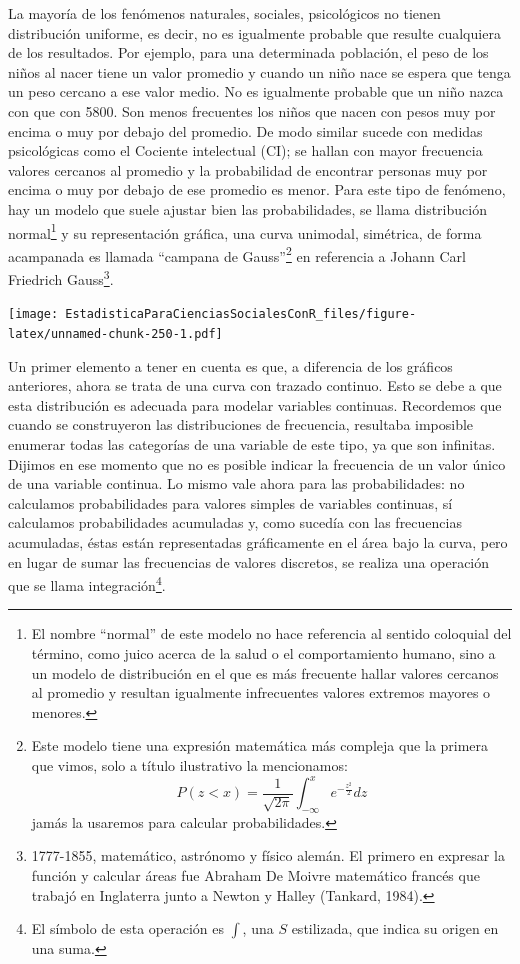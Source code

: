 \documentclass[]{book}
\let\rmarkdownfootnote\footnote%
\def\footnote{\protect\rmarkdownfootnote}
\begin{document}
La mayoría de los fenómenos naturales, sociales, psicológicos no tienen
distribución uniforme, es decir, no es igualmente probable que resulte
cualquiera de los resultados. Por ejemplo, para una determinada
población, el peso de los niños al nacer tiene un valor promedio y
cuando un niño nace se espera que tenga un peso cercano a ese valor
medio. No es igualmente probable que un niño nazca con que con 5800. Son
menos frecuentes los niños que nacen con pesos muy por encima o muy por
debajo del promedio. De modo similar sucede con medidas psicológicas
como el Cociente intelectual (CI); se hallan con mayor frecuencia
valores cercanos al promedio y la probabilidad de encontrar personas muy
por encima o muy por debajo de ese promedio es menor. Para este tipo de
fenómeno, hay un modelo que suele ajustar bien las probabilidades, se
llama distribución normal\footnote{El nombre ``normal'' de este modelo no hace referencia al sentido
  coloquial del término, como juico acerca de la salud o el
  comportamiento humano, sino a un modelo de distribución en el que es
  más frecuente hallar valores cercanos al promedio y resultan
  igualmente infrecuentes valores extremos mayores o menores.} y su representación gráfica, una curva
unimodal, simétrica, de forma acampanada es llamada ``campana de
Gauss''\footnote{Este modelo tiene una expresión matemática más compleja que la primera que vimos, solo a título ilustrativo la mencionamos: \[P(z < x) = \frac{1}{\sqrt{2\pi}}\int_{- \infty}^{x}e^{- \frac{z^{2}}{2}} dz\] jamás la usaremos para calcular probabilidades.} en referencia a Johann Carl Friedrich Gauss\footnote{1777-1855, matemático, astrónomo y físico alemán. El primero en
  expresar la función y calcular áreas fue Abraham De Moivre
  matemático francés que trabajó en Inglaterra junto a Newton y Halley
  (Tankard, 1984).}.

\texttt{[image: EstadisticaParaCienciasSocialesConR\_files/figure-latex/unnamed-chunk-250-1.pdf]}

Un primer elemento a tener en cuenta es que, a diferencia de los
gráficos anteriores, ahora se trata de una curva con trazado continuo.
Esto se debe a que esta distribución es adecuada para modelar variables
continuas. Recordemos que cuando se construyeron las distribuciones de
frecuencia, resultaba imposible enumerar todas las categorías de una
variable de este tipo, ya que son infinitas. Dijimos en ese momento que
no es posible indicar la frecuencia de un valor único de una variable
continua. Lo mismo vale ahora para las probabilidades: no calculamos
probabilidades para valores simples de variables continuas, sí
calculamos probabilidades acumuladas y, como sucedía con las frecuencias
acumuladas, éstas están representadas gráficamente en el área bajo la
curva, pero en lugar de sumar las frecuencias de valores discretos, se
realiza una operación que se llama integración\footnote{El símbolo de esta operación es \(\int\), una \(S\) estilizada, que indica
  su origen en una suma.}.
\end{document}
